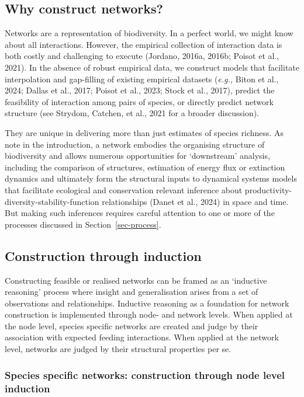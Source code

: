 \documentclass[
]{article}
\begin{document}
\subsection{Why construct networks?}\label{why-construct-networks}

Networks are a representation of biodiversity. In a perfect world, we
might know about all interactions. However, the empirical collection of
interaction data is both costly and challenging to execute (Jordano,
2016a, 2016b; Poisot et al., 2021). In the absence of robust empirical
data, we construct models that facilitate interpolation and gap-filling
of existing empirical datasets (\emph{e.g.,} Biton et al., 2024; Dallas
et al., 2017; Poisot et al., 2023; Stock et al., 2017), predict the
feasibility of interaction among pairs of species, or directly predict
network structure (see Strydom, Catchen, et al., 2021 for a broader
discussion).

They are unique in delivering more than just estimates of species
richness. As note in the introduction, a network embodies the organising
structure of biodiversity and allows numerous opportunities for
`downstream' analysis, including the comparison of structures,
estimation of energy flux or extinction dynamics and ultimately form the
structural inputs to dynamical systems models that facilitate ecological
and conservation relevant inference about
productivity-diversity-stability-function relationships (Danet et al.,
2024) in space and time. But making such inferences requires careful
attention to one or more of the processes discussed in
Section~\ref{sec-process}.

\subsection{Construction through induction}\label{sec-construct-induct}

Constructing feasible or realised networks can be framed as an
`inductive reasoning' process where insight and generalisation arises
from a set of observations and relationships. Inductive reasoning as a
foundation for network construction is implemented through node- and
network levels. When applied at the node level, species specific
networks are created and judge by their association with expected
feeding interactions. When applied at the network level, networks are
judged by their structural properties per se.

\subsubsection{Species specific networks: construction through node
level
induction}\label{species-specific-networks-construction-through-node-level-induction}
\end{document}
